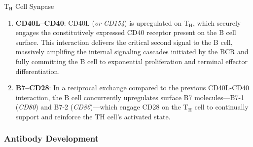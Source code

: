 \begin{core}[label=core:immune_synapse]{T$_\text{H}$ Cell Synpase}
\begin{enumerate}
          \item \textbf{CD40L--CD40}: CD40L (\textit{or CD154}) is upregulated on T$_\text{H}$, which securely engages the constitutively expressed CD40 receptor present on the B cell surface. This interaction delivers the critical second signal to the B cell, massively amplifing the internal signaling cascades initiated by the BCR and fully committing the B cell to exponential proliferation and terminal effector differentiation.

          \item \textbf{B7--CD28}: In a reciprocal exchange compared to the previous CD40L-CD40 interaction, the B cell concurrently upregulates surface B7 molecules---B7-1 (\textit{CD80}) and B7-2 (\textit{CD86})---which engage CD28 on the T$_\text{H}$ cell to continually support and reinforce the TH cell’s activated state.

        \end{enumerate}

      \end{core}

    \subsubsection{Antibody Development}

